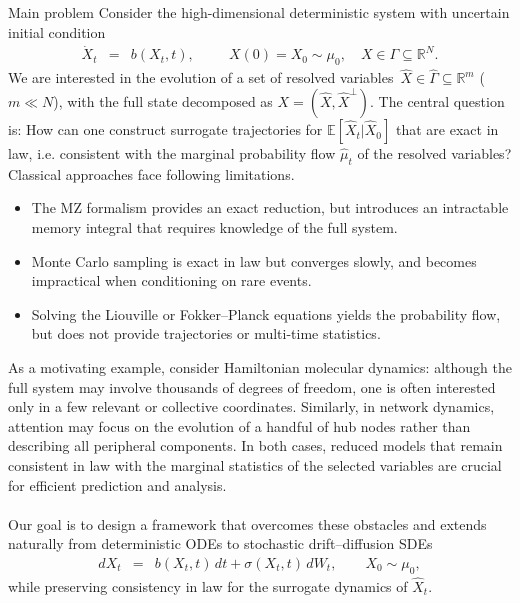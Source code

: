 \documentclass[11pt, a4paper, oneside, reqno]{amsart}
\makeatletter
\def\subsection{\@startsection{subsection}{2}%
	\z@{.5\linespacing\@plus.7\linespacing}{.5\linespacing}%
	{\normalfont\large\bfseries}}
\makeatother
\begin{document}
\subsection{Main problem}
\noindent Consider the high-dimensional deterministic system with uncertain initial condition
\begin{eqnarray} \label{eq:ode1}
\dot{X}_t &=& b(X_t,t), \ \  \qquad X(0)=X_0 \sim \mu_0, \quad X\in\Gamma\subseteq\mathbb{R}^N.
\end{eqnarray}
We are interested in the evolution of a set of resolved variables $\,\hat{X}\in\hat{\Gamma}\subseteq\mathbb{R}^m$ ($m\ll N$), with the full state decomposed as $X=(\hat{X},\hat{X}^{\perp})$. The central question is: { How can one construct surrogate trajectories for $\mathbb{E}[\hat{X}_t|\hat{X}_0]$ that are exact in law, i.e. consistent with the marginal probability flow $\hat{\mu}_t$ of the resolved variables?}
Classical approaches face following limitations.
\begin{itemize}
\item The MZ formalism provides an exact reduction, but introduces an intractable memory integral that requires knowledge of the full system.
\item Monte Carlo sampling is exact in law but converges slowly, and becomes impractical when conditioning on rare events. 
\item Solving the Liouville or Fokker–Planck equations yields the probability flow, but does not provide trajectories or multi-time statistics.
\end{itemize}
As a motivating example, consider Hamiltonian molecular dynamics: although the full system may involve thousands of degrees of freedom, one is often interested only in a few relevant or collective coordinates. Similarly, in network dynamics, attention may focus on the evolution of a handful of hub nodes rather than describing all peripheral components. In both cases, reduced models that remain consistent in law with the marginal statistics of the selected variables are crucial for efficient prediction and analysis. \\ \ \\
Our goal is to design a framework that overcomes these obstacles and extends naturally from deterministic ODEs to stochastic drift–diffusion SDEs
\begin{eqnarray}\label{eq:sde1}
dX_t &=& b(X_t,t)\,dt + \sigma(X_t,t)\,dW_t, \qquad X_0 \sim \mu_0,
\end{eqnarray}
while preserving consistency in law for the surrogate dynamics of $\hat{X}_t$.
\end{document}
